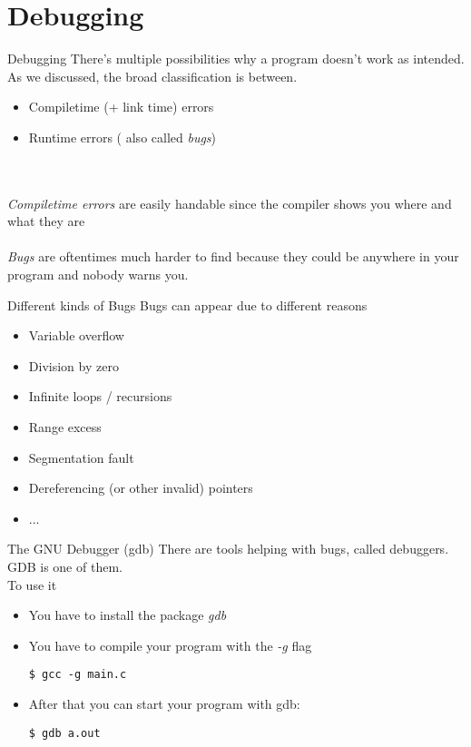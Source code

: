 \documentclass[10pt,graphics,aspectratio=169,table]{beamer}
\begin{document}
\section{Debugging}
\begin{frame}[fragile]{Debugging}
    There's multiple possibilities why a program doesn't work as intended.
    As we discussed, the broad classification is between.
    \begin{itemize}
		\item Compiletime (+ link time) errors
		\item Runtime errors ( also called \textit{bugs})
	\end{itemize}\ \\\ \\
	\textit{Compiletime errors} are easily handable since the compiler shows you where and what they are\\\ \\
    \textit{Bugs} are oftentimes much harder to find because they could be 
        anywhere in your program and nobody warns you.
\end{frame}

\begin{frame}{Different kinds of Bugs}
	Bugs can appear due to different reasons
	\begin{itemize}
		\item Variable overflow
		\item Division by zero
		\item Infinite loops / recursions
		\item Range excess
		\item Segmentation fault
		\item Dereferencing  (or other invalid) pointers
		\item ...
	\end{itemize}
\end{frame}

\begin{frame}[fragile]{The GNU Debugger (gdb) }
	There are tools helping with bugs, called debuggers. GDB is one of them.\\
	\bigskip
	To use it
	\begin{itemize}
		\item You have to install the package \textit{gdb}\\
		\item You have to compile your program with the \textit{-g} flag
		\begin{lstlisting}[numbers=none]
$ gcc -g main.c
\end{lstlisting}
		\item After that you can start your program with gdb:
		\begin{lstlisting}[numbers=none]
$ gdb a.out
\end{lstlisting}
	\end{itemize}
\end{frame}
\end{document}
